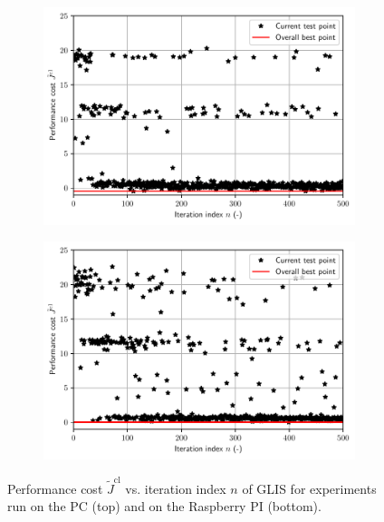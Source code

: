 \documentclass{article}
\newcommand{\JCt}{{\tilde{J}^\mathrm{cl}}}
\begin{document}
\begin{figure}
\centering
\begin{subfigure}[b]{\textwidth}
   \includegraphics[width=1\linewidth]{fig/ITER_GLIS_PC_500.pdf}
\end{subfigure}

\begin{subfigure}[b]{\textwidth}
   \includegraphics[width=1\linewidth]{fig/ITER_GLIS_PI_500.pdf}
\end{subfigure}
\caption{Performance cost $\JCt$ vs. iteration index $n$ of GLIS for experiments  run on the PC (top) and on the Raspberry PI (bottom).}
\label{fig:iterations}
\end{figure}
 
\end{document}
